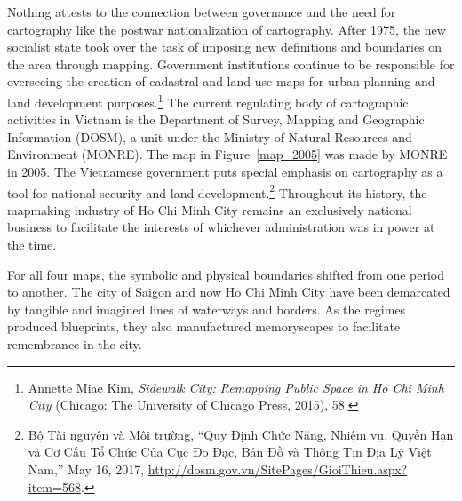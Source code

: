 \vi
Nothing attests to the connection between governance and the need for cartography like the postwar nationalization of cartography. After 1975, the new socialist state took over the task of imposing new definitions and boundaries on the area through mapping.  Government institutions continue to be responsible for overseeing the creation of cadastral and land use maps for urban planning and land development purposes.\footnote{Annette Miae Kim, \textit{Sidewalk City: Remapping Public Space in Ho Chi Minh City} (Chicago: The University of Chicago Press, 2015), 58.} The current regulating body of cartographic activities in Vietnam is the Department of Survey, Mapping and Geographic Information (DOSM), a unit under the Ministry of Natural Resources and Environment (MONRE). The map in Figure~\ref{map_2005} was made by MONRE in 2005. The Vietnamese government puts special emphasis on cartography as a tool for national security and land development.\footnote{Bộ Tài nguyên và Môi trường, “Quy Định Chức Năng, Nhiệm vụ, Quyền Hạn và Cơ Cấu Tổ Chức Của Cục Đo Đạc, Bản Đồ và Thông Tin Địa Lý Việt Nam,” May 16, 2017, \url{http://dosm.gov.vn/SitePages/GioiThieu.aspx?item=568}.} Throughout its history, the mapmaking industry of Ho Chi Minh City remains an exclusively national business to facilitate the interests of whichever administration was in power at the time.

For all four maps, the symbolic and physical boundaries shifted from one period to another. The city of Saigon and now Ho Chi Minh City have been demarcated by tangible and imagined lines of waterways and borders. As the regimes produced blueprints, they also manufactured memoryscapes to facilitate remembrance in the city.

